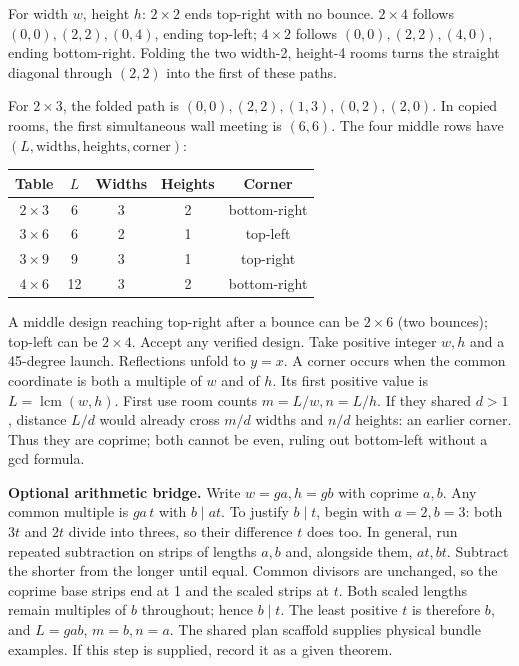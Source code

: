 \documentclass[11pt]{article}
\begin{document}
For width $w$, height $h$: $2\times2$ ends top-right with no bounce. $2\times4$ follows $(0,0),(2,2),(0,4)$, ending top-left; $4\times2$ follows $(0,0),(2,2),(4,0)$, ending bottom-right. Folding the two width-2, height-4 rooms turns the straight diagonal through $(2,2)$ into the first of these paths.

For $2\times3$, the folded path is $(0,0),(2,2),(1,3),(0,2),(2,0)$. In copied rooms, the first simultaneous wall meeting is $(6,6)$. The four middle rows have $(L,\text{widths},\text{heights},\text{corner})$:
\begin{center}\renewcommand{\arraystretch}{1.35}\begin{tabular}{c|c|c|c|c}Table&$L$&Widths&Heights&Corner\\\hline$2\times3$&6&3&2&bottom-right\\$3\times6$&6&2&1&top-left\\$3\times9$&9&3&1&top-right\\$4\times6$&12&3&2&bottom-right\end{tabular}\end{center}
A middle design reaching top-right after a bounce can be $2\times6$ (two bounces); top-left can be $2\times4$. Accept any verified design.
Take positive integer $w,h$ and a 45-degree launch. Reflections unfold to $y=x$. A corner occurs when the common coordinate is both a multiple of $w$ and of $h$. Its first positive value is $L=\operatorname{lcm}(w,h)$. First use room counts $m=L/w,n=L/h$. If they shared $d>1$, distance $L/d$ would already cross $m/d$ widths and $n/d$ heights: an earlier corner. Thus they are coprime; both cannot be even, ruling out bottom-left without a gcd formula.

\textbf{Optional arithmetic bridge.} Write $w=ga,h=gb$ with coprime $a,b$. Any common multiple is $ga\,t$ with $b\mid at$. To justify $b\mid t$, begin with $a=2,b=3$: both $3t$ and $2t$ divide into threes, so their difference $t$ does too. In general, run repeated subtraction on strips of lengths $a,b$ and, alongside them, $at,bt$. Subtract the shorter from the longer until equal. Common divisors are unchanged, so the coprime base strips end at 1 and the scaled strips at $t$. Both scaled lengths remain multiples of $b$ throughout; hence $b\mid t$. The least positive $t$ is therefore $b$, and $L=gab$, $m=b,n=a$. The shared plan scaffold supplies physical bundle examples. If this step is supplied, record it as a given theorem.
\end{document}
